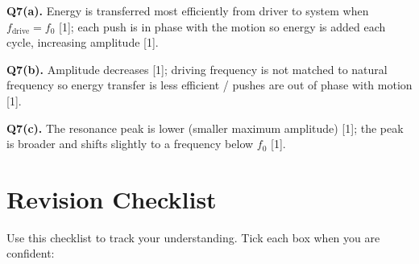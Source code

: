 \begin{markscheme}
\vspace{0.5em}\textbf{Q7(a).} Energy is transferred most efficiently from driver to system when $f_{\text{drive}} = f_0$ [1]; each push is in phase with the motion so energy is added each cycle, increasing amplitude [1].

\vspace{0.5em}\textbf{Q7(b).} Amplitude decreases [1]; driving frequency is not matched to natural frequency so energy transfer is less efficient / pushes are out of phase with motion [1].

\vspace{0.5em}\textbf{Q7(c).} The resonance peak is lower (smaller maximum amplitude) [1]; the peak is broader and shifts slightly to a frequency below $f_0$ [1].

\end{markscheme}

\newpage
\section{Revision Checklist}

Use this checklist to track your understanding. Tick each box when you are confident:

